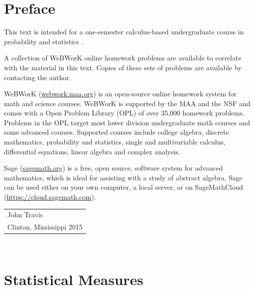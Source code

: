 \documentclass[10pt,]{book}
\theoremstyle{plain}
\theoremstyle{definition}
\theoremstyle{definition}
\theoremstyle{definition}
\numberwithin{equation}{section}
\begin{document}
\chapter*{Preface}\label{preface-1}
This text is intended for a one-semester calculus-based undergraduate course in probability and statistics .%
\par
A collection of WeBWorK online homework problems are available to correlate with the material in this text. Copies of these sets of problems are available by contacting the author.%
\par
        
        WeBWorK (\href{http://webwork.maa.org}{webwork.maa.org}) is an open-source online homework system for math and science courses. WeBWorK is supported by the MAA and the NSF and comes with a Open Problem Library (OPL) of over 35,000 homework problems. Problems in the OPL target most lower division undergraduate math courses and some advanced courses. Supported courses include college algebra, discrete mathematics, probability and statistics, single and multivariable calculus, differential equations, linear algebra and complex analysis.%
\par
Sage (\href{http://sagemath.org}{sagemath.org}) is a free, open source, software system for advanced mathematics, which is ideal for assisting with a study of abstract algebra. Sage can be used either on your own computer, a local server, or on SageMathCloud (\href{https://cloud.sagemath.com}{https://cloud.sagemath.com}). %
\par\hfill\begin{tabular}{l@{}}
John Travis\\
Clinton, Mississippi  2015
\end{tabular}\\\par
\setcounter{tocdepth}{1}
\renewcommand*\contentsname{Contents}
\tableofcontents
\mainmatter
\typeout{************************************************}
\typeout{************************************************}
\chapter[{Statistical Measures}]{Statistical Measures}\label{RepresentingData}
\typeout{************************************************}
\typeout{************************************************}
\end{document}
